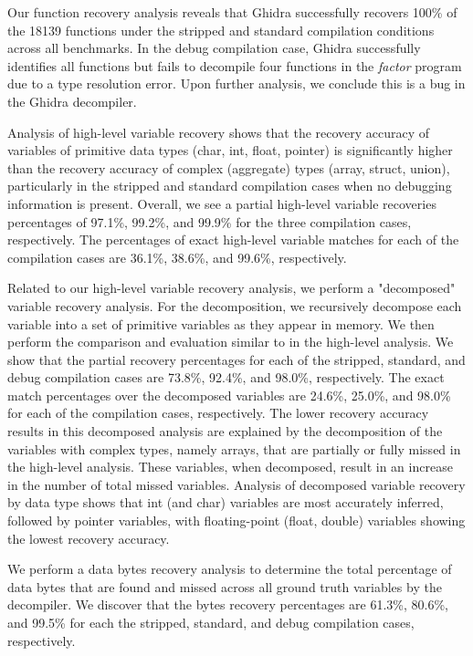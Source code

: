 Our function recovery analysis reveals that Ghidra successfully recovers 100\% of the 18139 functions under the stripped and standard compilation conditions across all benchmarks. In the debug compilation case, Ghidra successfully identifies all functions but fails to decompile four functions in the \emph{factor} program due to a type resolution error. Upon further analysis, we conclude this is a bug in the Ghidra decompiler.

Analysis of high-level variable recovery shows that the recovery accuracy of variables of primitive data types (char, int, float, pointer) is significantly higher than the recovery accuracy of complex (aggregate) types (array, struct, union), particularly in the stripped and standard compilation cases when no debugging information is present. Overall, we see a partial high-level variable recoveries percentages of 97.1\%, 99.2\%, and 99.9\% for the three compilation cases, respectively. The percentages of exact high-level variable matches for each of the compilation cases are 36.1\%, 38.6\%, and 99.6\%, respectively.

Related to our high-level variable recovery analysis, we perform a "decomposed" variable recovery analysis. For the decomposition, we recursively decompose each variable into a set of primitive variables as they appear in memory. We then perform the comparison and evaluation similar to in the high-level analysis. We show that the partial recovery percentages for each of the stripped, standard, and debug compilation cases are 73.8\%, 92.4\%, and 98.0\%, respectively. The exact match percentages over the decomposed variables are 24.6\%, 25.0\%, and 98.0\% for each of the compilation cases, respectively. The lower recovery accuracy results in this decomposed analysis are explained by the decomposition of the variables with complex types, namely arrays, that are partially or fully missed in the high-level analysis. These variables, when decomposed, result in an increase in the number of total missed variables. Analysis of decomposed variable recovery by data type shows that int (and char) variables are most accurately inferred, followed by pointer variables, with floating-point (float, double) variables showing the lowest recovery accuracy.

We perform a data bytes recovery analysis to determine the total percentage of data bytes that are found and missed across all ground truth variables by the decompiler. We discover that the bytes recovery percentages are 61.3\%, 80.6\%, and 99.5\% for each the stripped, standard, and debug compilation cases, respectively.

